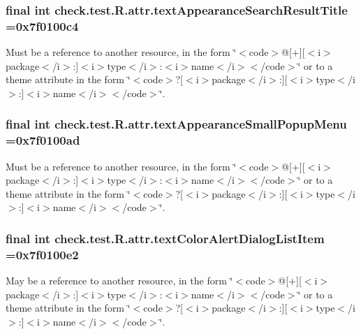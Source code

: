 \subsubsection[{text\+Appearance\+Search\+Result\+Title}]{\setlength{\rightskip}{0pt plus 5cm}final int check.\+test.\+R.\+attr.\+text\+Appearance\+Search\+Result\+Title =0x7f0100c4\hspace{0.3cm}{\ttfamily [static]}}\label{classcheck_1_1test_1_1_r_1_1attr_a13a9931a99a930b514fe408c215c4cd6}
Must be a reference to another resource, in the form \char`\"{}$<$code$>$@\mbox{[}+\mbox{]}\mbox{[}$<$i$>$package$<$/i$>$\+:\mbox{]}$<$i$>$type$<$/i$>$\+:$<$i$>$name$<$/i$>$$<$/code$>$\char`\"{} or to a theme attribute in the form \char`\"{}$<$code$>$?\mbox{[}$<$i$>$package$<$/i$>$\+:\mbox{]}\mbox{[}$<$i$>$type$<$/i$>$\+:\mbox{]}$<$i$>$name$<$/i$>$$<$/code$>$\char`\"{}. \hypertarget{classcheck_1_1test_1_1_r_1_1attr_a8b92407d50d5bf64b97cf69cd93cfc6e}{}
\subsubsection[{text\+Appearance\+Small\+Popup\+Menu}]{\setlength{\rightskip}{0pt plus 5cm}final int check.\+test.\+R.\+attr.\+text\+Appearance\+Small\+Popup\+Menu =0x7f0100ad\hspace{0.3cm}{\ttfamily [static]}}\label{classcheck_1_1test_1_1_r_1_1attr_a8b92407d50d5bf64b97cf69cd93cfc6e}
Must be a reference to another resource, in the form \char`\"{}$<$code$>$@\mbox{[}+\mbox{]}\mbox{[}$<$i$>$package$<$/i$>$\+:\mbox{]}$<$i$>$type$<$/i$>$\+:$<$i$>$name$<$/i$>$$<$/code$>$\char`\"{} or to a theme attribute in the form \char`\"{}$<$code$>$?\mbox{[}$<$i$>$package$<$/i$>$\+:\mbox{]}\mbox{[}$<$i$>$type$<$/i$>$\+:\mbox{]}$<$i$>$name$<$/i$>$$<$/code$>$\char`\"{}. \hypertarget{classcheck_1_1test_1_1_r_1_1attr_a425298cc593c901237a84e3e18629040}{}
\subsubsection[{text\+Color\+Alert\+Dialog\+List\+Item}]{\setlength{\rightskip}{0pt plus 5cm}final int check.\+test.\+R.\+attr.\+text\+Color\+Alert\+Dialog\+List\+Item =0x7f0100e2\hspace{0.3cm}{\ttfamily [static]}}\label{classcheck_1_1test_1_1_r_1_1attr_a425298cc593c901237a84e3e18629040}
May be a reference to another resource, in the form \char`\"{}$<$code$>$@\mbox{[}+\mbox{]}\mbox{[}$<$i$>$package$<$/i$>$\+:\mbox{]}$<$i$>$type$<$/i$>$\+:$<$i$>$name$<$/i$>$$<$/code$>$\char`\"{} or to a theme attribute in the form \char`\"{}$<$code$>$?\mbox{[}$<$i$>$package$<$/i$>$\+:\mbox{]}\mbox{[}$<$i$>$type$<$/i$>$\+:\mbox{]}$<$i$>$name$<$/i$>$$<$/code$>$\char`\"{}. 

